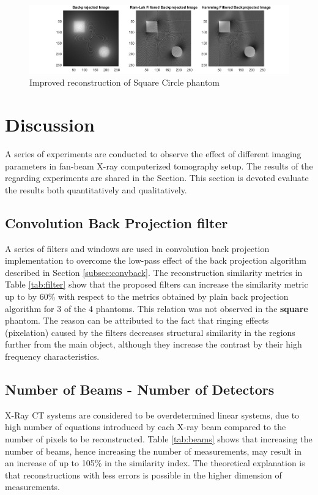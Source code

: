 \documentclass[journal]{IEEEtran}
\begin{document}
\begin{figure}[h]
	\centering
	\includegraphics[width=\columnwidth,height=.12\textheight]{images/sqcircimproved.png}
	\caption{Improved reconstruction of Square Circle phantom}\label{fig:sqcircimproved}
\end{figure}
\newpage
\section{Discussion} \label{sec:discuss}

A series of experiments are conducted to observe the effect of different imaging parameters in fan-beam X-ray computerized tomography setup. The results of the regarding experiments are shared in the  Section. This section is devoted evaluate the results both quantitatively and qualitatively.
\subsection{Convolution Back Projection filter}

A series of filters and windows are used in convolution back projection implementation to overcome the low-pass effect of the back projection algorithm described in Section \ref{subsec:convback}. The reconstruction similarity metrics in Table \ref{tab:filter} show that the proposed filters can increase the similarity metric up to by 60\% with respect to the metrics obtained by plain back projection algorithm for 3 of the 4 phantoms. This relation was not observed in the \textbf{square} phantom. The reason can be attributed to the fact that ringing effects (pixelation) caused by the filters decreases structural similarity in the regions further from the main object, although they increase the contrast by their high frequency characteristics. 
\subsection{Number of Beams - Number of Detectors} \label{subsec:beams}

X-Ray CT systems are considered to be overdetermined linear systems, due to high number of equations introduced by each X-ray beam compared to the number of pixels to be reconstructed. Table \ref{tab:beams} shows that increasing the number of beams, hence increasing the number of measurements, may result in an increase of up to 105\% in the similarity index. The theoretical explanation is that reconstructions with less errors is possible in the higher dimension of measurements.
\end{document}
